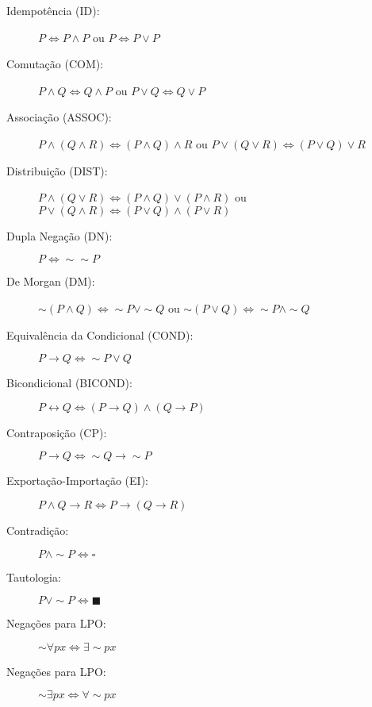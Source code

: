 \documentclass[12pt]{article}
\begin{document}
\begin{enumerate}
{\begin{description}
\item[Idempotência (ID):] $P\Leftrightarrow P\wedge P$ ou $P\Leftrightarrow P\vee P$
\item[Comutação (COM):] $P\wedge Q\Leftrightarrow Q\wedge P$ ou $P\vee Q\Leftrightarrow Q\vee P$
\item[Associação (ASSOC):] $P\wedge(Q\wedge R)\Leftrightarrow (P\wedge Q)\wedge R$ ou $P\vee(Q\vee R)\Leftrightarrow (P\vee Q)\vee R$ 
\item[Distribuição (DIST):] $P\wedge(Q\vee R)\Leftrightarrow (P\wedge Q)\vee (P \wedge R)$ ou $P\vee(Q\wedge R)\Leftrightarrow (P\vee Q)\wedge (P\vee R)$
\item[Dupla Negação (DN):] $P\Leftrightarrow\sim\sim P$
\item[De Morgan (DM):] $\sim(P \wedge Q) \Leftrightarrow \sim P \vee\sim Q$ ou $\sim(P \vee Q) \Leftrightarrow \sim P \wedge\sim Q$
\item[Equivalência da Condicional (COND):] $P\rightarrow Q \Leftrightarrow\sim P \vee Q$

\item[Bicondicional (BICOND):] $P\leftrightarrow Q \Leftrightarrow (P\rightarrow Q)\wedge(Q\rightarrow P)$

\item[Contraposição (CP):] $P\rightarrow Q \Leftrightarrow \sim Q\rightarrow\sim P$

\item[Exportação-Importação (EI):] $P\wedge Q\rightarrow R \Leftrightarrow P\rightarrow(Q\rightarrow R)$

\item[Contradição:] $P\wedge \sim P \Leftrightarrow \square $

\item[Tautologia:] $ P\vee \sim P \Leftrightarrow \blacksquare    $

\item[Negações para LPO:] $ \sim \forall px \Leftrightarrow \exists \sim px $

\item[Negações para LPO:] $ \sim \exists px \Leftrightarrow \forall \sim px $

\end{description}

}
\end{enumerate}
\end{document}
